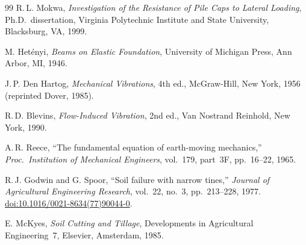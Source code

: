 \documentclass[11pt,a4paper]{article}
\begin{document}
\begin{thebibliography}{99}
R.\,L. Mokwa,
\emph{Investigation of the Resistance of Pile Caps to Lateral Loading},
Ph.D.\ dissertation, Virginia Polytechnic Institute and State University, Blacksburg, VA, 1999.

M. Het\'enyi,
\emph{Beams on Elastic Foundation},
University of Michigan Press, Ann Arbor, MI, 1946.

J.\,P. Den Hartog,
\emph{Mechanical Vibrations}, 4th ed.,
McGraw-Hill, New York, 1956 (reprinted Dover, 1985).

R.\,D. Blevins,
\emph{Flow-Induced Vibration}, 2nd ed.,
Van Nostrand Reinhold, New York, 1990.

A.\,R. Reece,
``The fundamental equation of earth-moving mechanics,''
\emph{Proc.\ Institution of Mechanical Engineers}, vol.~179, part~3F, pp.~16--22, 1965.

R.\,J. Godwin and G. Spoor,
``Soil failure with narrow tines,''
\emph{Journal of Agricultural Engineering Research}, vol.~22, no.~3, pp.~213--228, 1977.
\href{https://doi.org/10.1016/0021-8634(77)90044-0}{doi:10.1016/0021-8634(77)90044-0}.

E. McKyes,
\emph{Soil Cutting and Tillage}, Developments in Agricultural Engineering~7,
Elsevier, Amsterdam, 1985.

\end{thebibliography}
\end{document}
